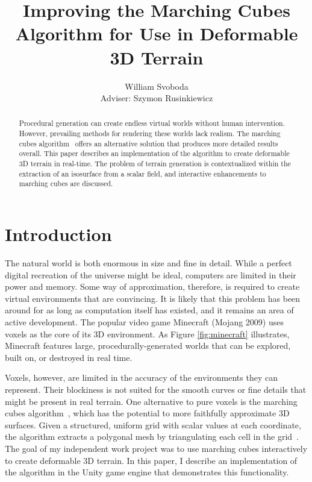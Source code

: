 \documentclass[pageno]{jpaper}
\begin{document}
\title{Improving the Marching Cubes Algorithm for Use in Deformable 3D Terrain}

\author{William Svoboda\\Adviser: Szymon Rusinkiewicz}

\date{}
\maketitle

\thispagestyle{empty}
\doublespacing
\begin{abstract}
Procedural generation can create endless virtual worlds without human intervention. However, prevailing methods for rendering these worlds lack realism. The marching cubes algorithm~\cite{lorensen} offers an alternative solution that produces more detailed results overall. This paper describes an implementation of the algorithm to create deformable 3D terrain in real-time. The problem of terrain generation is contextualized within the extraction of an isosurface from a scalar field, and interactive enhancements to marching cubes are discussed.
\end{abstract}

\section{Introduction}

The natural world is both enormous in size and fine in detail. While a perfect digital recreation of the universe might be ideal, computers are limited in their power and memory. Some way of approximation, therefore, is required to create virtual environments that are convincing. It is likely that this problem has been around for as long as computation itself has existed, and it remains an area of active development. The popular video game Minecraft (Mojang 2009) uses voxels as the core of its 3D environment. As Figure \ref{fig:minecraft} illustrates, Minecraft features large, procedurally-generated worlds that can be explored, built on, or destroyed in real time.

Voxels, however, are limited in the accuracy of the environments they can represent. Their blockiness is not suited for the smooth curves or fine details that might be present in real terrain. One alternative to pure voxels is the marching cubes algorithm~\cite{lorensen}, which has the potential to more faithfully approximate 3D surfaces. Given a structured, uniform grid with scalar values at each coordinate, the algorithm extracts a polygonal mesh by triangulating each cell in the grid~\cite{lorensen,kieran}. The goal of my independent work project was to use marching cubes interactively to create deformable 3D terrain. In this paper, I describe an implementation of the algorithm in the Unity game engine that demonstrates this functionality.
\end{document}

